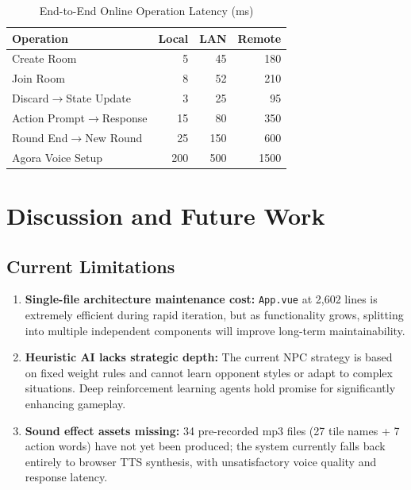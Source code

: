 \documentclass[11pt,a4paper]{article}
\begin{document}
\begin{table}[H]
\centering
\caption{End-to-End Online Operation Latency (ms)}
\label{tab:oplat}
\small
\begin{tabular}{@{}lrrr@{}}
\toprule
\textbf{Operation} & \textbf{Local} & \textbf{LAN} & \textbf{Remote} \\
\midrule
Create Room & 5 & 45 & 180 \\
Join Room & 8 & 52 & 210 \\
Discard$\to$State Update & 3 & 25 & 95 \\
Action Prompt$\to$Response & 15 & 80 & 350 \\
Round End$\to$New Round & 25 & 150 & 600 \\
Agora Voice Setup & 200 & 500 & 1500 \\
\bottomrule
\end{tabular}
\end{table}

\newpage
\section{Discussion and Future Work}

\subsection{Current Limitations}

\begin{enumerate}[nosep]
  \item \textbf{Single-file architecture maintenance cost:} \texttt{App.vue} at 2,602 lines is extremely efficient during rapid iteration, but as functionality grows, splitting into multiple independent components will improve long-term maintainability.
  \item \textbf{Heuristic AI lacks strategic depth:} The current NPC strategy is based on fixed weight rules and cannot learn opponent styles or adapt to complex situations. Deep reinforcement learning agents hold promise for significantly enhancing gameplay.
  \item \textbf{Sound effect assets missing:} 34 pre-recorded mp3 files (27 tile names + 7 action words) have not yet been produced; the system currently falls back entirely to browser TTS synthesis, with unsatisfactory voice quality and response latency.
\end{enumerate}
\end{document}
